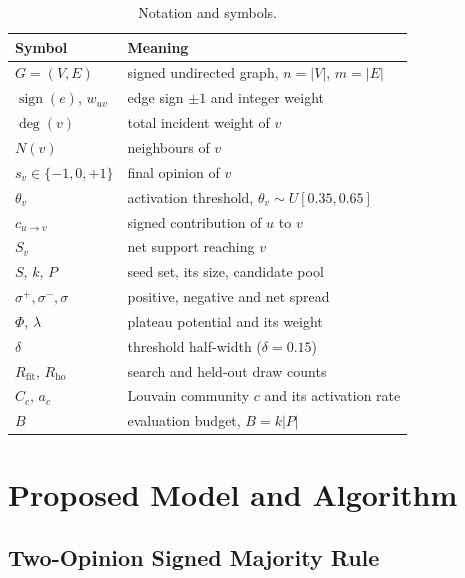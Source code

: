 \documentclass[journal,letterpaper,10pt]{IEEEtran}
\begin{document}
\begin{table}[!t]
\centering
\caption{Notation and symbols.}
\label{tab:notation}
\footnotesize
\setlength{\tabcolsep}{3pt}
\begin{tabular}{@{}ll@{}}
\toprule
Symbol & Meaning\\
\midrule
$G=(V,E)$ & signed undirected graph, $n=|V|$, $m=|E|$\\
$\operatorname{sign}(e)$, $w_{uv}$ & edge sign $\pm1$ and integer weight\\
$\deg(v)$ & total incident weight of $v$\\
$N(v)$ & neighbours of $v$\\
$s_v\in\{-1,0,+1\}$ & final opinion of $v$\\
$\theta_v$ & activation threshold, $\theta_v\sim U[0.35,0.65]$\\
$c_{u\to v}$ & signed contribution of $u$ to $v$\\
$S_v$ & net support reaching $v$\\
$S$, $k$, $P$ & seed set, its size, candidate pool\\
$\sigma^{+},\sigma^{-},\sigma$ & positive, negative and net spread\\
$\Phi$, $\lambda$ & plateau potential and its weight\\
$\delta$ & threshold half-width ($\delta=0.15$)\\
$R_{\mathrm{fit}}$, $R_{\mathrm{ho}}$ & search and held-out draw counts\\
$C_c$, $a_c$ & Louvain community $c$ and its activation rate\\
$B$ & evaluation budget, $B=k|P|$\\
\bottomrule
\end{tabular}
\end{table}

\section{Proposed Model and Algorithm}

\subsection{Two-Opinion Signed Majority Rule}
\end{document}
